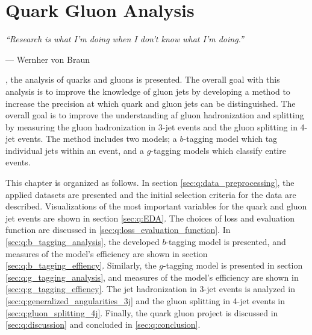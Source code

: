 
\chapter{Quark Gluon Analysis}
\label{ch:quark_gluon_analysis}
\epigraph{\textit{``Research is what I'm doing when I don’t know what I’m doing.''}}{---  Wernher von Braun}



, the analysis of quarks and gluons is presented. The overall goal with this analysis is to improve the knowledge of gluon jets by developing a method to increase the precision at which quark and gluon jets can be distinguished. The overall goal is to improve the understanding af gluon hadronization and splitting by measuring the gluon hadronization in 3-jet events and the gluon splitting in 4-jet events.
The method includes two models; a $b$-tagging model which tag individual jets within an event, and a $g$-tagging models which classify entire events. 


This chapter is organized as follows. In section \autoref{sec:q:data_preprocessing}, the applied datasets are presented and the initial selection criteria for the data are described. Visualizations of the most important variables for the quark and gluon jet events are shown in section \autoref{sec:q:EDA}. The choices of loss and evaluation function are discussed in \autoref{sec:q:loss_evaluation_function}. In \autoref{sec:q:b_tagging_analysis}, the developed $b$-tagging model is presented, and measures of the model's efficiency are shown in section \autoref{sec:q:b_tagging_effiency}. Similarly, the $g$-tagging model is presented in section \autoref{sec:q:g_tagging_analysis}, and measures of the model's efficiency are shown in \autoref{sec:q:g_tagging_effiency}. The jet hadronization in 3-jet events is analyzed in \autoref{sec:q:generalized_angularities_3j} and the gluon splitting in 4-jet events in \autoref{sec:q:gluon_splitting_4j}. Finally, the quark gluon project is discussed in \autoref{sec:q:discussion} and concluded in \autoref{sec:q:conclusion}.


